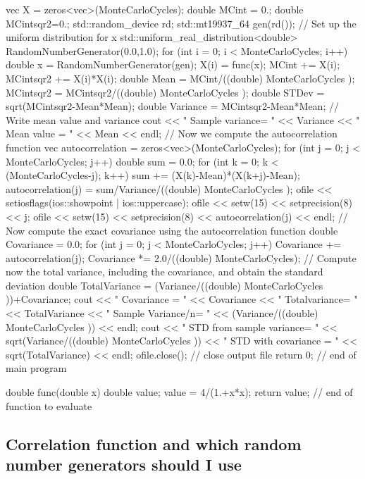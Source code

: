 \documentclass[%
oneside,                 %
final,                   %
10pt]{article}
\newenvironment{block_mdfboxadmon}[1][]{
\begin{block_mdfboxmdframed}[frametitle=#1]
}
{
\end{block_mdfboxmdframed}
}
\begin{document}
\begin{block_mdfboxadmon}[]
{  vec X  = zeros<vec>(MonteCarloCycles);
  double MCint = 0.;      double MCintsqr2=0.;
  std::random_device rd;
  std::mt19937_64 gen(rd());
  // Set up the uniform distribution for x \in [[0, 1]
  std::uniform_real_distribution<double> RandomNumberGenerator(0.0,1.0);
  for (int i = 0;  i < MonteCarloCycles; i++){
    double x =   RandomNumberGenerator(gen); 
    X(i) = func(x);
    MCint += X(i);
    MCintsqr2 += X(i)*X(i);
  }
  double Mean = MCint/((double) MonteCarloCycles );
  MCintsqr2 = MCintsqr2/((double) MonteCarloCycles );
  double STDev = sqrt(MCintsqr2-Mean*Mean);
  double Variance = MCintsqr2-Mean*Mean;
  //   Write mean value and variance
  cout << " Sample variance= " << Variance  << " Mean value = " << Mean << endl;
  // Now we compute the autocorrelation function
  vec autocorrelation = zeros<vec>(MonteCarloCycles);
  for (int j = 0; j < MonteCarloCycles; j++){
    double sum = 0.0;
    for (int k = 0; k < (MonteCarloCycles-j); k++){
      sum  += (X(k)-Mean)*(X(k+j)-Mean); 
    }
    autocorrelation(j) = sum/Variance/((double) MonteCarloCycles );
    ofile << setiosflags(ios::showpoint | ios::uppercase);
    ofile << setw(15) << setprecision(8) << j;
    ofile << setw(15) << setprecision(8) << autocorrelation(j) << endl;
  }
  // Now compute the exact covariance using the autocorrelation function
  double Covariance = 0.0;
  for (int j = 0; j < MonteCarloCycles; j++){
    Covariance  += autocorrelation(j);
  }
  Covariance *=  2.0/((double) MonteCarloCycles);
  // Compute now the total variance, including the covariance, and obtain the standard deviation
  double TotalVariance = (Variance/((double) MonteCarloCycles ))+Covariance;
  cout << " Covariance = " << Covariance << " Totalvariance= " << TotalVariance << " Sample Variance/n= " << (Variance/((double) MonteCarloCycles )) << endl;
  cout << " STD from sample variance= " << sqrt(Variance/((double) MonteCarloCycles )) << " STD with covariance = " << sqrt(TotalVariance) << endl;
  ofile.close();  // close output file
  return 0;
}  // end of main program 


double func(double x)
{
  double value;
  value = 4/(1.+x*x);
  return value;
} // end of function to evaluate 

\ecppcod
\end{block_mdfboxadmon} %






\subsection{Correlation function and which random number generators should I use}
\end{document}
